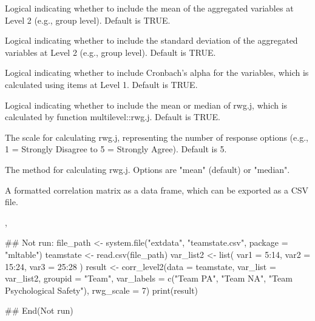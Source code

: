 \documentclass[a4paper]{book}
\begin{document}
\begin{Arguments}
\begin{ldescription}
\item[\code{mean}] Logical indicating whether to include the mean of
the aggregated variables at Level 2 (e.g., group level).
Default is TRUE.

\item[\code{sd}] Logical indicating whether to include the standard deviation of
the aggregated variables at Level 2 (e.g., group level). Default is TRUE.

\item[\code{alpha}] Logical indicating whether to include Cronbach's alpha for
the variables, which is calculated using items at Level 1. Default is TRUE.

\item[\code{rwg}] Logical indicating whether to include the mean or median of rwg.j,
which is calculated by function multilevel::rwg.j.
Default is TRUE.

\item[\code{rwg\_scale}] The scale for calculating rwg.j, representing the number of
response options (e.g., 1 = Strongly Disagree to 5 = Strongly Agree). Default is 5.

\item[\code{rwg\_method}] The method for calculating rwg.j.
Options are "mean" (default) or "median".
\end{ldescription}
\end{Arguments}
%
\begin{Value}
A formatted correlation matrix as a data frame, which can be exported
as a CSV file.
\end{Value}
%
\begin{SeeAlso}
, 
\end{SeeAlso}
%
\begin{Examples}
\begin{ExampleCode}
## Not run: 
file_path <- system.file("extdata", "teamstate.csv", package = "mltable")
teamstate <- read.csv(file_path)
var_list2 <- list(
  var1 = 5:14,
  var2 = 15:24,
  var3 = 25:28
)
result <- corr_level2(data = teamstate,
                      var_list = var_list2,
                      groupid = "Team",
                      var_labels = c("Team PA", "Team NA", "Team Psychological Safety"),
                      rwg_scale = 7)
print(result)

## End(Not run)

\end{ExampleCode}
\end{Examples}
\end{document}
